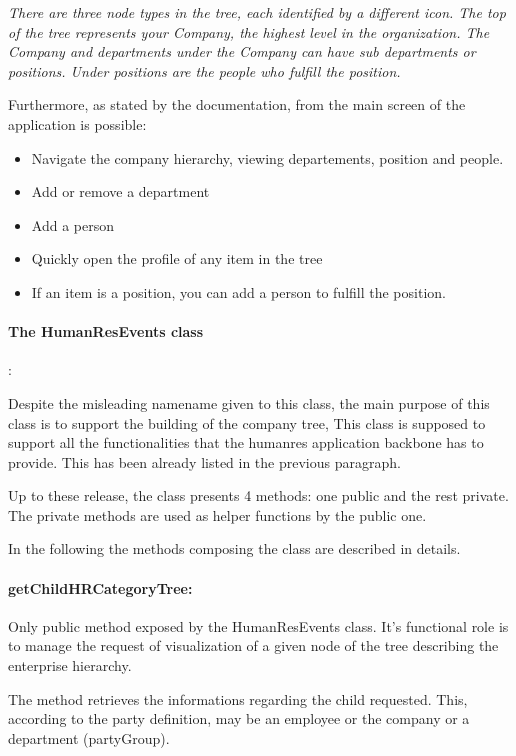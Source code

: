 \textit{There are three node types in the tree, each identified by a different icon. The top of the tree represents your Company, the highest level in the organization. The Company and departments under the Company can have sub departments or positions. Under positions are the people who fulfill the position.}

Furthermore, as stated by the documentation, from the main screen of the application is possible:

\begin{itemize}
	\item Navigate the company hierarchy, viewing departements, position and people.
	\item Add or remove a department
	\item Add a person
	\item Quickly open the profile of any item in the tree
	\item If an item is a position, you can add a person to fulfill the position.
\end{itemize}

\paragraph{The HumanResEvents class}:

Despite the misleading namename given to this class, the main purpose of this class is to support the building of the company tree, 
This class is supposed to support all the functionalities that the humanres application backbone has to provide. This has been already listed in the previous paragraph.

Up to these release, the class presents 4 methods: one public and the rest private.
The private methods are used as helper functions by the public one.

In the following the methods composing the class are described in details.

\paragraph{getChildHRCategoryTree:}

Only public method exposed by the HumanResEvents class. It's functional role is to manage the request of visualization of a given node of the tree describing the enterprise hierarchy.

The method retrieves the informations regarding the child requested. This, according to the party definition, may be an employee or the company or a department (partyGroup).

